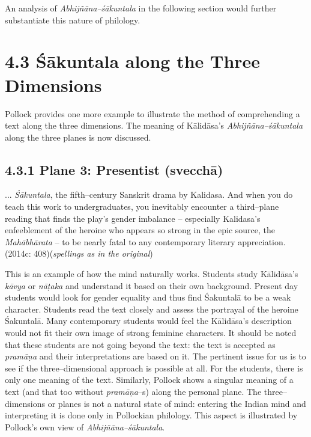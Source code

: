 An analysis of \textit{Abhijñāna–śākuntala} in the following section would further substantiate this nature of philology.


\section*{4.3 Śākuntala along the Three Dimensions}

Pollock provides one more example to illustrate the method of comprehending a text along the three dimensions. The meaning of Kālidāsa’s \textit{Abhijñāna–śākuntala }along the three planes is now discussed.

\subsection*{4.3.1 Plane 3: Presentist (svecchā)}

\begin{myquote}
... \textit{Śākuntala}, the fifth–century Sanskrit drama by Kalidasa. And when you do teach this work to undergraduates, you inevitably encounter a third–plane reading that finds the play’s gender imbalance – especially Kalidasa’s enfeeblement of the heroine who appears so strong in the epic source, the \textit{Mahābhārata} – to be nearly fatal to any contemporary literary appreciation. (2014c: 408)(\textit{spellings as in the original})
\end{myquote}

This is an example of how the mind naturally works. Students study Kālidāsa’s \textit{kāvya} or \textit{nāṭaka} and understand it based on their own background. Present day students would look for gender equality and thus find Śakuntalā to be a weak character. Students read the text closely and assess the portrayal of the heroine Śakuntalā. Many contemporary students would feel the Kālidāsa’s description would not fit their own image of strong feminine characters. It should be noted that these students are not going beyond the text: the text is accepted as \textit{pramāṇa} and their interpretations are based on it. The pertinent issue for us is to see if the three–dimensional approach is possible at all. For the students, there is only one meaning of the text. Similarly, Pollock shows a singular meaning of a text (and that too without \textit{pramāṇa}–s) along the personal plane. The three–dimensions or planes is not a natural state of mind: entering the Indian mind and interpreting it is done only in Pollockian philology. This aspect is illustrated by Pollock’s own view of \textit{Abhijñāna–śākuntala}.

